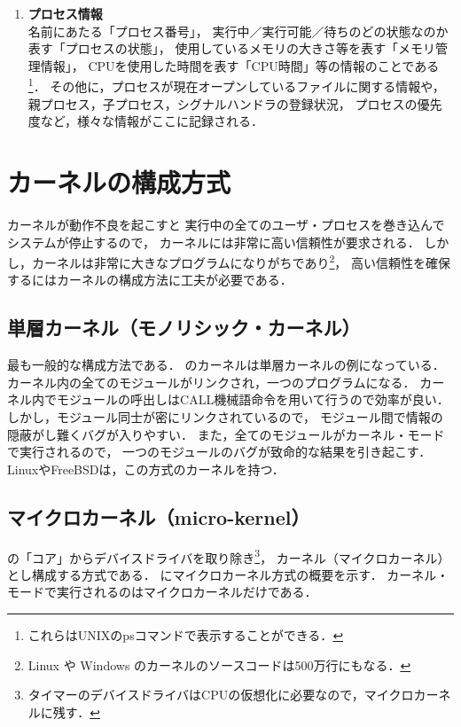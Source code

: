 \begin{enumerate}
\begin{enumerate}
\end{enumerate}

\item {\bf プロセス情報} \\
名前にあたる「プロセス番号」，
実行中／実行可能／待ちのどの状態なのか表す「プロセスの状態」，
使用しているメモリの大きさ等を表す「メモリ管理情報」，
CPUを使用した時間を表す「CPU時間」等の情報のことである\footnote{
これらはUNIXのpsコマンドで表示することができる．}．
その他に，プロセスが現在オープンしているファイルに関する情報や，
親プロセス，子プロセス，シグナルハンドラの登録状況，
プロセスの優先度など，様々な情報がここに記録される．
\end{enumerate}

\section{カーネルの構成方式}
カーネルが動作不良を起こすと
実行中の全てのユーザ・プロセスを巻き込んでシステムが停止するので，
カーネルには非常に高い信頼性が要求される．
しかし，カーネルは非常に大きなプログラムになりがちであり\footnote{
Linux や Windows のカーネルのソースコードは500万行にもなる\cite{lines}．}，
高い信頼性を確保するにはカーネルの構成方法に工夫が必要である．

\subsection{単層カーネル（モノリシック・カーネル）}
最も一般的な構成方法である．
のカーネルは単層カーネルの例になっている．
カーネル内の全てのモジュールがリンクされ，一つのプログラムになる．
カーネル内でモジュールの呼出しはCALL機械語命令を用いて行うので効率が良い．
しかし，モジュール同士が密にリンクされているので，
モジュール間で情報の隠蔽がし難くバグが入りやすい．
また，全てのモジュールがカーネル・モードで実行されるので，
一つのモジュールのバグが致命的な結果を引き起こす．
LinuxやFreeBSDは，この方式のカーネルを持つ．

\subsection{マイクロカーネル（micro-kernel）}
の「コア」からデバイスドライバを取り除き\footnote{
タイマーのデバイスドライバはCPUの仮想化に必要なので，マイクロカーネルに残す．}，
カーネル（マイクロカーネル）とし構成する方式である．
にマイクロカーネル方式の概要を示す．
カーネル・モードで実行されるのはマイクロカーネルだけである．


